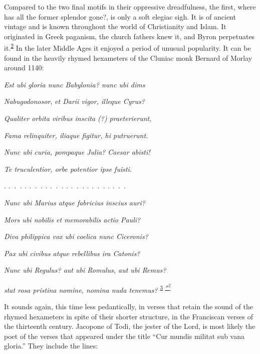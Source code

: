 Compared to the two final motifs in their oppressive dreadfulness, the
first, where has all the former splendor gone?, is only a soft elegiac
sigh. It is of ancient vintage and is known throughout the world of
Christianity and Islam. It originated in Greek paganism, the church
fathers knew it, and Byron perpetuates
it.\textsuperscript{\protect\hypertarget{12_Chapter_Five__THE_VISION_OF_DEAT.xhtmlux5cux23id_1347}{\protect\hyperlink{23_NOTES.xhtmlux5cux23id_1348}{2}}}
In the later Middle Ages it enjoyed a period of unusual popularity. It
can be found in the heavily rhymed hexameters of the Cluniac monk
Bernard of Morlay around 1140:

\emph{Est ubi gloria nunc Babylonia? nunc ubi dims}

\emph{Nabugodonosor}, \emph{et Darii vigor, illeque Cyrus?}

\emph{Qualiter orbita viribus inscita (?) praeterierunt},

\emph{Fama relinquiter, iliaque figitur, hi putruerunt}.

\emph{Nunc ubi curia, pompaque Julia? Caesar abisti!}

\emph{Te truculentior, orbe potentior ipse fuisti}.

. \emph{.~.~. . .~.~. . .~.~. . .~.~. . .~.~. . .~.~}.

\emph{Nunc ubi Marius atque fabricius inscius auri?}

\emph{Mors ubi nobilis et memorabilis actio Pauli?}

\emph{Diva philippica vox ubi coelica nunc Ciceronis?}

\emph{Pax ubi civibus atque rebellibus ira Catonis?}

\emph{Nunc ubi Regulus? aut ubi Romulus, aut ubi Remus?}

\emph{stat rosa pristina nomine, nomina nuda tenemus?}
\textsuperscript{\protect\hypertarget{12_Chapter_Five__THE_VISION_OF_DEAT.xhtmlux5cux23id_1345}{\protect\hyperlink{23_NOTES.xhtmlux5cux23id_1346}{3}}
\emph{\protect\hypertarget{12_Chapter_Five__THE_VISION_OF_DEAT.xhtmlux5cux23id_2955}{\protect\hyperlink{23_NOTES.xhtmlux5cux23id_2956}{*\textsuperscript{2}}}}}

It sounds again, this time less pedantically, in verses that retain the
sound of the rhymed hexameters in spite of their shorter structure,
\protect\hypertarget{12_Chapter_Five__THE_VISION_OF_DEAT.xhtmlux5cux23page_158}{}{}in
the Franciscan verses of the thirteenth century. Jacopone of Todi, the
jester of the Lord, is most likely the poet of the verses that appeared
under the title ``Cur mundis militat sub vana gloria.'' They include the
lines:

